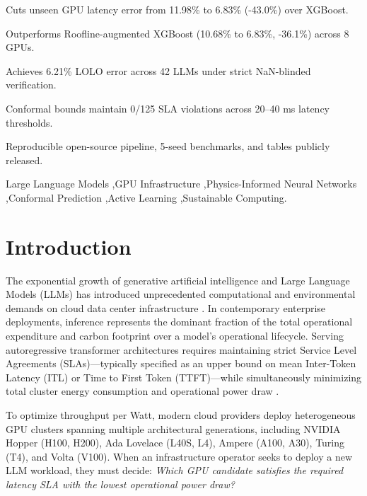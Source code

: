 \documentclass[preprint,12pt]{elsarticle}
\begin{document}
\begin{frontmatter}
\begin{highlights}
\item Cuts unseen GPU latency error from 11.98\% to 6.83\% (-43.0\%) over XGBoost.
\item Outperforms Roofline-augmented XGBoost (10.68\% to 6.83\%, -36.1\%) across 8 GPUs.
\item Achieves 6.21\% LOLO error across 42 LLMs under strict NaN-blinded verification.
\item Conformal bounds maintain 0/125 SLA violations across 20--40 ms latency thresholds.
\item Reproducible open-source pipeline, 5-seed benchmarks, and tables publicly released.
\end{highlights}

\begin{keyword}
Large Language Models \sep GPU Infrastructure \sep Physics-Informed Neural Networks \sep Conformal Prediction \sep Active Learning \sep Sustainable Computing.
\end{keyword}

\end{frontmatter}

\linenumbers

\section{Introduction}
\label{sec:intro}

The exponential growth of generative artificial intelligence and Large Language Models (LLMs) has introduced unprecedented computational and environmental demands on cloud data center infrastructure \citep{strubell2019energy, patterson2021carbon, suscom_desislavov2023}. In contemporary enterprise deployments, inference represents the dominant fraction of the total operational expenditure and carbon footprint over a model's operational lifecycle. Serving autoregressive transformer architectures requires maintaining strict Service Level Agreements (SLAs)---typically specified as an upper bound on mean Inter-Token Latency (ITL) or Time to First Token (TTFT)---while simultaneously minimizing total cluster energy consumption and operational power draw \citep{kwon2023vllm, suscom_malekloo2018}.

To optimize throughput per Watt, modern cloud providers deploy heterogeneous GPU clusters spanning multiple architectural generations, including NVIDIA Hopper (H100, H200), Ada Lovelace (L40S, L4), Ampere (A100, A30), Turing (T4), and Volta (V100). When an infrastructure operator seeks to deploy a new LLM workload, they must decide: \textit{Which GPU candidate satisfies the required latency SLA with the lowest operational power draw?}
\end{document}
